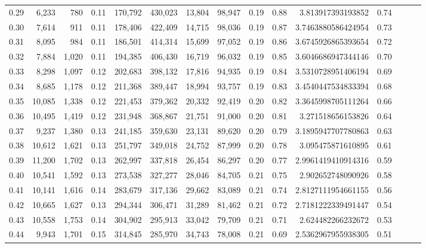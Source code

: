\begin{tabular}{rrrrrrrrrrrrrrr}
0.29 &   6,233 &    780 &  0.11 &  170,792 &  430,023 &   13,804 &   98,947 &  0.19 &  0.88 &     3.813917393193852 &      0.74 \\
0.30 &   7,614 &    911 &  0.11 &  178,406 &  422,409 &   14,715 &   98,036 &  0.19 &  0.87 &    3.7463880586424954 &      0.73 \\
0.31 &   8,095 &    984 &  0.11 &  186,501 &  414,314 &   15,699 &   97,052 &  0.19 &  0.86 &    3.6745926865393654 &      0.72 \\
0.32 &   7,884 &  1,020 &  0.11 &  194,385 &  406,430 &   16,719 &   96,032 &  0.19 &  0.85 &    3.6046686947344146 &      0.70 \\
0.33 &   8,298 &  1,097 &  0.12 &  202,683 &  398,132 &   17,816 &   94,935 &  0.19 &  0.84 &    3.5310728951406194 &      0.69 \\
0.34 &   8,685 &  1,178 &  0.12 &  211,368 &  389,447 &   18,994 &   93,757 &  0.19 &  0.83 &    3.4540447534833394 &      0.68 \\
0.35 &  10,085 &  1,338 &  0.12 &  221,453 &  379,362 &   20,332 &   92,419 &  0.20 &  0.82 &    3.3645998705111264 &      0.66 \\
0.36 &  10,495 &  1,419 &  0.12 &  231,948 &  368,867 &   21,751 &   91,000 &  0.20 &  0.81 &     3.271518656153826 &      0.64 \\
0.37 &   9,237 &  1,380 &  0.13 &  241,185 &  359,630 &   23,131 &   89,620 &  0.20 &  0.79 &    3.1895947707780863 &      0.63 \\
0.38 &  10,612 &  1,621 &  0.13 &  251,797 &  349,018 &   24,752 &   87,999 &  0.20 &  0.78 &     3.095475871610895 &      0.61 \\
0.39 &  11,200 &  1,702 &  0.13 &  262,997 &  337,818 &   26,454 &   86,297 &  0.20 &  0.77 &    2.9961419410914316 &      0.59 \\
0.40 &  10,541 &  1,592 &  0.13 &  273,538 &  327,277 &   28,046 &   84,705 &  0.21 &  0.75 &     2.902652748090926 &      0.58 \\
0.41 &  10,141 &  1,616 &  0.14 &  283,679 &  317,136 &   29,662 &   83,089 &  0.21 &  0.74 &    2.8127111954661155 &      0.56 \\
0.42 &  10,665 &  1,627 &  0.13 &  294,344 &  306,471 &   31,289 &   81,462 &  0.21 &  0.72 &    2.7181222339491447 &      0.54 \\
0.43 &  10,558 &  1,753 &  0.14 &  304,902 &  295,913 &   33,042 &   79,709 &  0.21 &  0.71 &     2.624482266232672 &      0.53 \\
0.44 &   9,943 &  1,701 &  0.15 &  314,845 &  285,970 &   34,743 &   78,008 &  0.21 &  0.69 &    2.5362967955938305 &      0.51 \\

\end{tabular}
